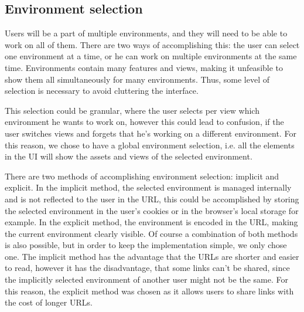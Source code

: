 



\subsection{Environment selection}

Users will be a part of multiple environments, and they will need to be able to work on
all of them.
There are two ways of accomplishing this: the user can select one environment at a time,
or he can work on multiple environments at the same time.
%
%
Environments contain many features and views, making it unfeasible to show them all
simultaneously for many environments.
Thus, some level of selection is necessary to avoid cluttering the interface.

%
This selection could be granular, where the user selects per view which environment he
wants to work on, however this could lead to confusion, if the user switches views and
forgets that he's working on a different environment.
For this reason, we chose to have a global environment selection, i.e. all the elements in
the UI will show the assets and views of the selected environment.

There are two methods of accomplishing environment selection: implicit and explicit.
In the implicit method, the selected environment is managed internally and is not
reflected to the user in the URL, this could be accomplished by storing the selected
environment in the user's cookies or in the browser's local storage for example.
In the explicit method, the environment is encoded in the URL,
making the current environment clearly visible.
Of course a combination of both methods is also possible, but in order to keep the
implementation simple, we only chose one.
The implicit method has the advantage that the URLs are shorter and easier to read,
however it has the disadvantage, that some links can't be shared, since the implicitly
selected environment of another user might not be the same. 
For this reason, the explicit method was chosen as it allows users to share links with the
cost of longer URLs.

